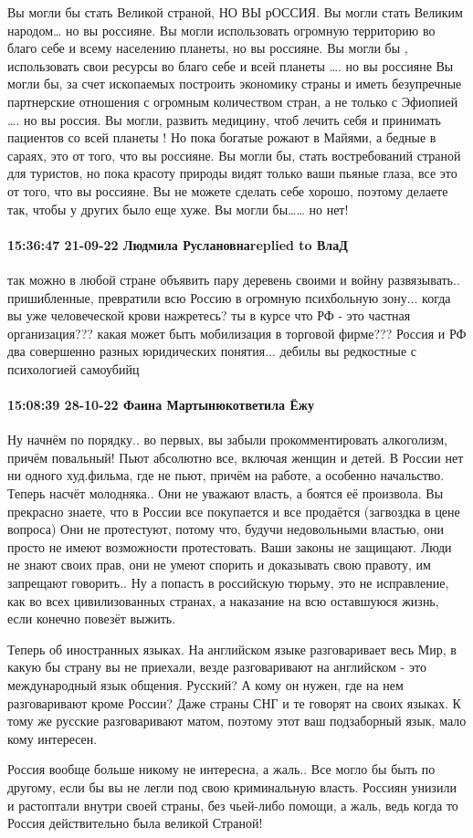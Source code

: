 Вы могли бы стать Великой страной, НО ВЫ рОССИЯ.
Вы могли стать Великим народом… но вы россияне.
Вы могли использовать огромную территорию во благо себе и всему населению планеты, но вы россияне.
Вы могли бы , использовать свои ресурсы во благо себе и всей планеты …. но вы россияне
Вы могли бы, за счет ископаемых построить экономику страны и иметь безупречные партнерские отношения с огромным количеством стран, а не только с Эфиопией …. но вы россия.
Вы могли, развить медицину, чтоб лечить себя и принимать пациентов со всей планеты ! Но пока богатые рожают в Майями, а бедные в сараях, это от того, что вы россияне.
Вы могли бы, стать востребований страной для туристов, но пока красоту природы видят только ваши пьяные глаза, все это от того, что вы россияне.
Вы не можете сделать себе хорошо, поэтому делаете так, чтобы у других было еще хуже.
Вы могли бы…… но нет!

\paragraph{15:36:47 21-09-22 Людмила Руслановнаreplied to ВлаД}

так можно в любой стране объявить пару деревень своими и войну развязывать..
пришибленные, превратили всю Россию в огромную психбольную зону... когда вы уже
человеческой крови нажретесь? ты в курсе что РФ - это частная организация???
какая может быть мобилизация в торговой фирме??? Россия и РФ два совершенно
разных юридических понятия... дебилы вы редкостные с психологией самоубийц


\paragraph{15:08:39 28-10-22 Фаина Мартынюкответила Ёжу}

Ну начнём по порядку.. во первых, вы забыли прокомментировать алкоголизм,
причём повальный! Пьют абсолютно все, включая женщин и детей. В России нет ни
одного худ.фильма, где не пьют, причём на работе, а особенно начальство. Теперь
насчёт молодняка.. Они не уважают власть, а боятся её произвола. Вы прекрасно
знаете, что в России все покупается и все продаётся (загвоздка в цене вопроса)
Они не протестуют, потому что, будучи недовольными властью, они просто не имеют
возможности протестовать. Ваши законы не защищают. Люди не знают своих прав,
они не умеют спорить и доказывать свою правоту, им запрещают говорить.. Ну а
попасть в российскую тюрьму, это не исправление, как во всех цивилизованных
странах, а наказание на всю оставшуюся жизнь, если конечно повезёт выжить.

Теперь об иностранных языках. На английском языке разговаривает весь Мир, в
какую бы страну вы не приехали, везде разговаривают на английском - это
международный язык общения. Русский? А кому он нужен, где на нем разговаривают
кроме России? Даже страны СНГ и те говорят на своих языках. К тому же русские
разговаривают матом, поэтому этот ваш подзаборный язык, мало кому интересен.

Россия вообще больше никому не интересна, а жаль.. Все могло бы быть по
другому, если бы вы не легли под свою криминальную власть. Россиян унизили и
растоптали внутри своей страны, без чьей-либо помощи, а жаль, ведь когда то
Россия действительно была великой Страной!
